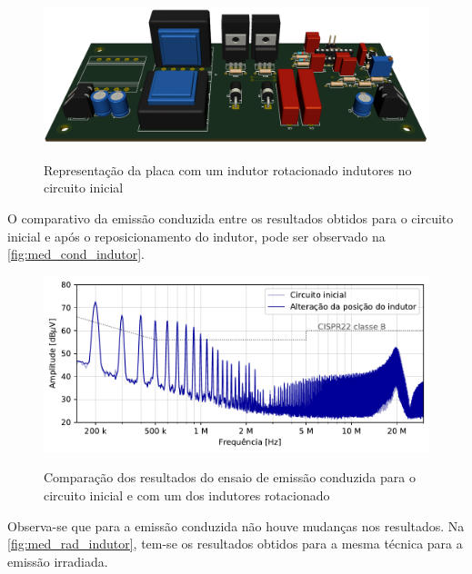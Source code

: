     \begin{figure}[H]
    	\centering
    	\caption{Representação da placa com um indutor rotacionado indutores no circuito inicial}
    	\includegraphics[scale=.3]{pdf/fotos/tecnica_indutor.png}
        \label{fig:foto_cbi_3}
    \end{figure}
    
    O  comparativo da emissão conduzida entre os resultados obtidos para o circuito inicial e após o reposicionamento do indutor, pode ser observado na \autoref{fig:med_cond_indutor}.
    
    \begin{figure}[H]
    	\centering
    	\caption{Comparação dos resultados do ensaio de emissão conduzida para o circuito inicial e com um dos indutores rotacionado}
    	\includegraphics[scale=.9]{pdf/cond/Alteração da posição do indutor.pdf}
    	\label{fig:med_cond_indutor}
    \end{figure}
    
    Observa-se que para a emissão conduzida não houve mudanças nos resultados. Na \autoref{fig:med_rad_indutor}, tem-se os resultados obtidos para a mesma técnica para a emissão irradiada. 
    
